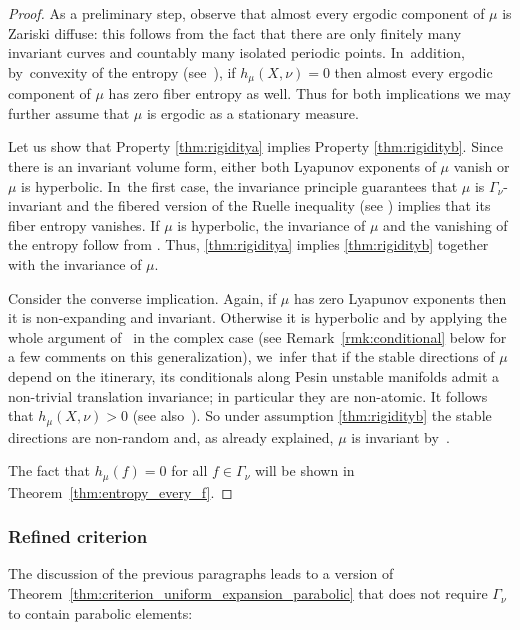 \documentclass[JEP,XML,SOM,Unicode,published]{cedram}
\theoremstyle{plain}
\theoremstyle{definition}
\begin{document}
\begin{proof}
As a preliminary step, observe that almost every ergodic component of $\mu$ is
Zariski diffuse: this follows from the fact that there are
only finitely many invariant curves and countably many isolated periodic points. In~addition, by~convexity
of the entropy (see~\cite[Prop.\,4.3.16]{katok-hasselblatt}), if $h_\mu(X, \nu)=0$ then almost every ergodic component of $\mu$ has zero fiber entropy as well.
Thus for both implications we may further assume that $\mu$ is ergodic as a stationary measure.

Let us show that Property \eqref{thm:rigiditya} implies Property \eqref{thm:rigidityb}. Since there is an invariant volume form, either
both Lyapunov exponents of $\mu$ vanish or $\mu$ is hyperbolic. In~the first case,
the invariance principle guarantees that $\mu$ is $\Gamma_\nu$-invariant and
the fibered version of the Ruelle inequality (see \eg \cite[\S 7]{stiffness}) implies that its fiber entropy
vanishes. If $\mu$ is hyperbolic, the invariance of $\mu$ and the vanishing of the entropy follow from
\cite[Th.\,9.1]{stiffness}.
Thus, \eqref{thm:rigiditya} implies \eqref{thm:rigidityb} together with the invariance of $\mu$.

Consider the converse implication. Again, if $\mu$ has zero Lyapunov exponents then it is non-expanding and
invariant. Otherwise it is hyperbolic and
by applying the whole argument of~\cite{br} in the complex case (see Remark~\ref{rmk:conditional} below for a few comments on this generalization), we~infer that if the stable directions of
$\mu$ depend on the itinerary, its conditionals along Pesin unstable manifolds admit a non-trivial
translation invariance; in particular they are non-atomic. It follows that $h_\mu(X, \nu)>0$
(see also~\cite[Rem.\,9.2]{stiffness}). So under assumption \eqref{thm:rigidityb} the stable directions are non-random and, as
already explained, $\mu$ is invariant by~\cite[Th.\,9.1]{stiffness}.

The fact that $h_\mu(f)=0$ for all $f\in \Gamma_\nu$ will be shown in
Theorem~\ref{thm:entropy_every_f}.
\end{proof}

\subsubsection{Refined criterion}

The discussion of the previous paragraphs leads to a version of
Theorem~\ref{thm:criterion_uniform_expansion_parabolic} that does not require $\Gamma_\nu$ to contain parabolic elements:
\end{document}
